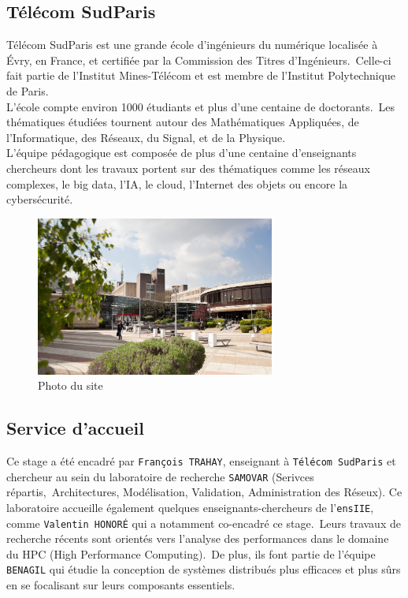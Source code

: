 
\subsection{Télécom SudParis}\label{ssec:introduction_nom_entreprise}

Télécom SudParis est une grande école d'ingénieurs du numérique localisée à Évry, en France, et certifiée par la Commission des Titres d'Ingénieurs.\
Celle-ci fait partie de l'Institut Mines-Télécom et est membre de l'Institut Polytechnique de Paris.\\
L'école compte environ 1000 étudiants et plus d'une centaine de doctorants.\
Les thématiques étudiées tournent autour des Mathématiques Appliquées, de l'Informatique, des Réseaux, du Signal, et de la Physique.\\
L'équipe pédagogique est composée de plus d'une centaine d'enseignants chercheurs dont les travaux portent sur des thématiques comme les
réseaux complexes, le big data, l'IA, le cloud, l'Internet des objets ou encore la cybersécurité.\

\begin{figure}[!h]
    \centering
    \includegraphics[width=0.7\textwidth]{img/campus_tsp.jpg}
    \caption{Photo du site}
    \label{fig:photo_site}
\end{figure}


\subsection{Service d'accueil}\label{ssec:introduction_service_accueil}

Ce stage a été encadré par \verb!François TRAHAY!, enseignant à \verb!Télécom SudParis! et chercheur au sein du laboratoire de recherche \verb!SAMOVAR! (Serivces répartis,\
Architectures, Modélisation, Validation, Administration des Réseux). Ce laboratoire accueille également quelques enseignants-chercheurs de l'\verb!ensIIE!, comme \verb!Valentin HONORÉ! qui a notamment co-encadré ce stage.\
Leurs travaux de recherche récents sont orientés vers l'analyse des performances dans le domaine du HPC (High Performance Computing).\
De plus, ils font partie de l'équipe \verb!BENAGIL! qui étudie la conception de systèmes distribués plus efficaces et plus sûrs en se focalisant sur leurs composants essentiels.

